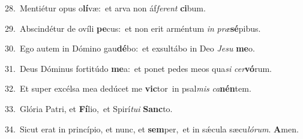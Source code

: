 {\numbfont\textcolor{\numbcolor}{28.}}~Mentiétur opus o\-\textbf{lí}\-væ:~\star et arva non áf\-\textit{fe}\-\textit{rent} \textbf{ci}\-bum.\par
{\numbfont\textcolor{\numbcolor}{29.}}~Abscindétur de ovíli \textbf{pe}\-cus:~\star et non erit arméntum \textit{in} \textit{præ}\-\textbf{sé}pibus.\par
{\numbfont\textcolor{\numbcolor}{30.}}~Ego autem in Dómino gau\-\textbf{dé}\-bo:~\star et exsultábo in Deo \textit{Je}\-\textit{su} \textbf{me}\-o.\par
{\numbfont\textcolor{\numbcolor}{31.}}~Deus Dóminus fortitúdo \textbf{me}\-a:~\star et ponet pedes meos qua\textit{si} \textit{cer}\-\textbf{vó}rum.\par
{\numbfont\textcolor{\numbcolor}{32.}}~Et super excélsa mea dedúcet me \textbf{vic}\-tor~\star in psal\textit{mis} \textit{ca}\-\textbf{nén}tem.\par
{\numbfont\textcolor{\numbcolor}{33.}}~Glória Patri, et \textbf{Fí}\-lio,~\star et Spirí\-\textit{tu}\-\textit{i} \textbf{Sanc}\-to.\par
{\numbfont\textcolor{\numbcolor}{34.}}~Sicut erat in princípio, et nunc, et \textbf{sem}\-per,~\star et in sǽcula sæcu\-\textit{ló}\-\textit{rum}. \textbf{A}\-men.\par
